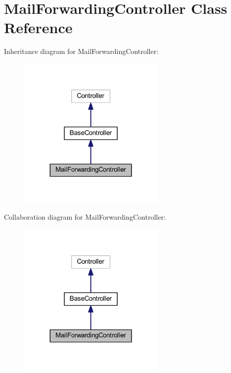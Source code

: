 \hypertarget{class_mail_forwarding_controller}{}\section{Mail\+Forwarding\+Controller Class Reference}
\label{class_mail_forwarding_controller}


Inheritance diagram for Mail\+Forwarding\+Controller\+:
\nopagebreak
\begin{figure}[H]
\begin{center}
\leavevmode
\includegraphics[width=203pt]{class_mail_forwarding_controller__inherit__graph}
\end{center}
\end{figure}


Collaboration diagram for Mail\+Forwarding\+Controller\+:
\nopagebreak
\begin{figure}[H]
\begin{center}
\leavevmode
\includegraphics[width=203pt]{class_mail_forwarding_controller__coll__graph}
\end{center}
\end{figure}
